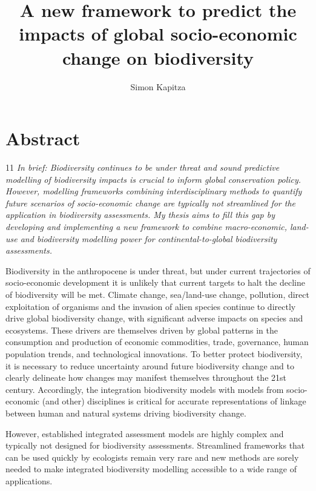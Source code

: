 \documentclass[titlesmallcaps,copyrightpage]{uomthesis}\usepackage[]{graphicx}\usepackage[]{color}
\begin{document}
\frontmatter
\title{A new framework to predict the impacts of global socio-economic change on biodiversity}

\author{Simon Kapitza}

\titlepage
\clearpage{\pagestyle{empty}\cleardoublepage}

\chapter{Abstract}
\begin{localsize-main}{11}
\noindent\textit{In brief: Biodiversity continues to be under threat and sound predictive modelling of biodiversity impacts is crucial to inform global conservation policy. However, modelling frameworks combining interdisciplinary methods to quantify future scenarios of socio-economic change are typically not streamlined for the application in biodiversity assessments. My thesis aims to fill this gap by developing and implementing a new framework to combine macro-economic, land-use and biodiversity modelling power for continental-to-global biodiversity assessments.}
\end{localsize-main}

\vspace{1.5cm}

Biodiversity in the anthropocene is under threat, but under current trajectories of socio-economic development it is unlikely that current targets to halt the decline of biodiversity will be met. Climate change, sea/land-use change, pollution, direct exploitation of organisms and the invasion of alien species continue to directly drive global biodiversity change, with significant adverse impacts on species and ecosystems. These drivers are themselves driven by global patterns in the consumption and production of economic commodities, trade, governance, human population trends, and technological innovations. To better protect biodiversity, it is necessary to reduce uncertainty around future biodiversity change and to clearly delineate how changes may manifest themselves throughout the 21st century. Accordingly, the integration biodiversity models with models from socio-economic (and other) disciplines is critical for accurate representations of linkage between human and natural systems driving biodiversity change. 

However, established integrated assessment models are highly complex and typically not designed for biodiversity assessments. Streamlined frameworks that can be used quickly by ecologists remain very rare and new methods are sorely needed to make integrated biodiversity modelling accessible to a wide range of applications. 
\end{document}
